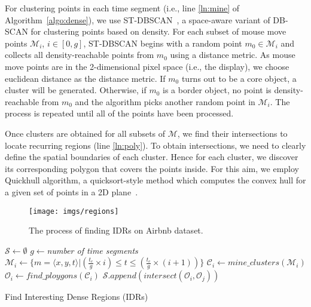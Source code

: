 \documentclass[sigconf,edbt]{acmart-edbt2019}
\begin{document}
\vspace{2pt}
For clustering points in each time segment (i.e., line \ref{ln:mine} of Algorithm~\ref{algo:dense}), we use ST-DBSCAN~\cite{Birant:2007}, a space-aware variant of DB-SCAN for clustering points based on density. For each subset of mouse move points $\mathcal{M}_i$, $i \in [0,g]$, ST-DBSCAN begins with a random point $m_0 \in \mathcal{M}_i$ and collects all density-reachable points from $m_0$ using a distance metric. As mouse move points are in the 2-dimensional pixel space (i.e., the display), we choose euclidean distance as the distance metric. If $m_0$ turns out to be a core object, a cluster will be generated. Otherwise, if $m_0$ is a border object, no point is density-reachable from $m_0$ and the algorithm picks another random point in $\mathcal{M}_i$. The process is repeated until all of the points have been processed.

\vspace{2pt}
Once clusters are obtained for all subsets of $\mathcal{M}$, we find their intersections to locate recurring regions (line \ref{ln:poly}). To obtain intersections, we need to clearly define the spatial boundaries of each cluster. Hence for each cluster, we discover its corresponding polygon that covers the points inside. For this aim, we employ Quickhull algorithm, a quicksort-style method which computes the convex hull for a given set of points in a 2D plane~\cite{Barber:1996}.

\begin{figure*}[t]
\centering
   \texttt{[image: imgs/regions]}
  \caption{The process of finding IDRs on \textsf{Airbnb} dataset.}
  \label{fig:regions}
\end{figure*}

\begin{algorithm}[t]
\DontPrintSemicolon
{}
$\mathcal{S} \gets \emptyset$\;
$g \gets ${\em number of time segments}\;
{
       $\mathcal{M}_i \gets \{m = \langle x,y,t \rangle | (\frac{t_c}{g} \times i) \leq t \leq (\frac{t_c}{g} \times (i+1))\}$\;
       $\mathcal{C}_i \gets \mathit{mine\_clusters}(\mathcal{M}_i)$\label{ln:mine}\;
       $\mathcal{O}_i \gets \mathit{find\_ploygons}(\mathcal{C}_i)$\label{ln:poly}\;
}
{
       $\mathcal{S}.\mathit{append}(\mathit{intersect}(\mathcal{O}_i, \mathcal{O}_j))$
}
\; 
\caption{Find Interesting Dense Regions (IDRs)}
\label{algo:dense}
\end{algorithm}
\end{document}
